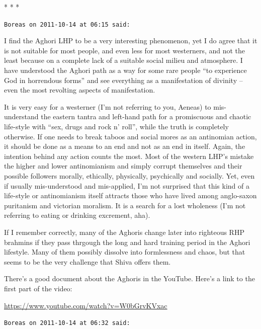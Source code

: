 
\begin{center}* * *\end{center}

\begin{footnotesize}
\begin{sffamily}
\texttt{Boreas on 2011-10-14 at 06:15 said:}

I find the Aghori LHP to be a very interesting phenomenon, yet I do agree that it is not suitable for most people, and even less for most westerners, and not the least because on a complete lack of a suitable social milieu and atmosphere. I have understood the Aghori path as a way for some rare people ``to experience God in horrendous forms'' and see everything as a manifestation of divinity -- even the most revolting aspects of manifestation.

It is very easy for a westerner (I'm not referring to you, Aeneas) to mis-understand the eastern tantra and left-hand path for a promiscuous and chaotic life-style with ``sex, drugs and rock n' roll'', while the truth is completely otherwise. If one needs to break taboos and social mores as an antinomian action, it should be done as a means to an end and not as an end in itself. Again, the intention behind any action counts the most. Most of the western LHP's mistake the higher and lower antinomianism and simply corrupt themselves and their possible followers morally, ethically, physically, psychically and socially. Yet, even if usually mis-understood and mis-applied, I'm not surprised that this kind of a life-style or antinomianism itself attracts those who have lived among anglo-saxon puritanism and victorian moralism. It is a search for a lost wholeness (I'm not referring to eating or drinking excrement, aha).

If I remember correctly, many of the Aghoris change later into righteous RHP brahmins if they pass thrgough the long and hard training period in the Aghori lifestyle. Many of them possibly dissolve into formlessness and chaos, but that seems to be the very challenge that Shiva offers them.

There's a good document about the Aghoris in the YouTube. Here's a link to the first part of the video:

\url{https://www.youtube.com/watch?v=W0bGrvKVxac}


\hfill

\texttt{Boreas on 2011-10-14 at 06:32 said:}


\end{sffamily}
\end{footnotesize}
